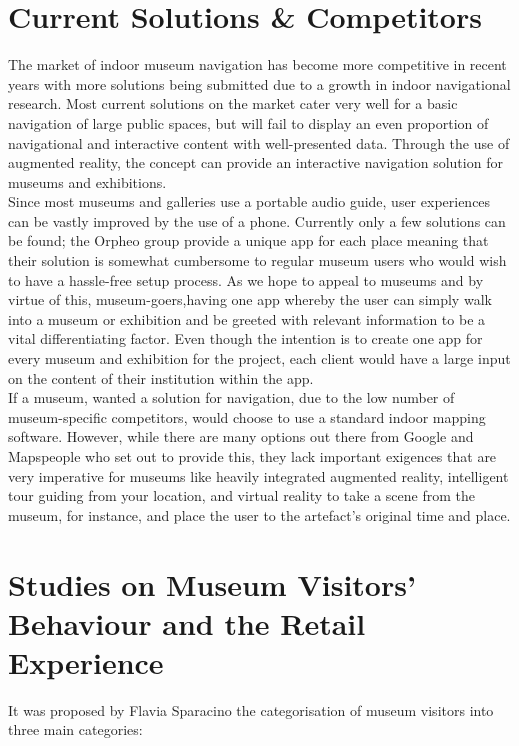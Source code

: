\section{Current Solutions \& Competitors}
The market of indoor museum navigation has become more competitive in recent years with more solutions being submitted due to a growth in indoor navigational research. Most current solutions on the market cater very well for a basic navigation of large public spaces, but will fail to display an even proportion of navigational and interactive content with well-presented data. Through the use of augmented reality, the concept can provide an interactive navigation solution for museums and exhibitions.\\
 
Since most museums and galleries use a portable audio guide, user experiences can be vastly improved by the use of a phone. Currently only a few solutions can be found; the Orpheo group \cite{orpheo} provide a unique app for each place meaning that their solution is somewhat cumbersome to regular museum users who would wish to have a hassle-free setup process. As we hope to appeal to museums and by virtue of this, museum-goers,having one app whereby the user can simply walk into a museum or exhibition and be greeted with relevant information to be a vital differentiating factor.\cite{microsoft} Even though the intention is to create one app for every museum and exhibition for the project, each client would have a large input on the content of their institution within the app.\\

If a museum, wanted a solution for navigation, due to the low number of museum-specific competitors, would choose to use a standard indoor mapping software. \cite{engadget} However, while there are many options out there from Google and Mapspeople \cite{mapspeople} who set out to provide this, they lack important exigences that are very imperative for museums like heavily integrated augmented reality, intelligent tour guiding from your location, and virtual reality to take a scene from the museum, for instance, and place the user to the artefact's original time and place.

\section{Studies on Museum Visitors' Behaviour and the Retail Experience}
It was proposed by Flavia Sparacino \cite{sparacino} the categorisation of museum visitors into three main categories: 

